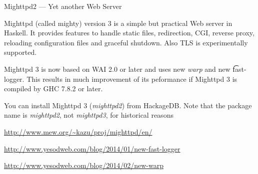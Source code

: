 \begin{hcarentry}[updated]{Mighttpd2 --- Yet another Web Server}
\label{mighttpd2}
\makeheader

Mighttpd (called mighty) version 3 is a simple but practical Web server in Haskell.
It provides features to handle static files, redirection, CGI, reverse proxy, reloading configuration files and graceful shutdown. Also TLS is experimentally supported.

Mighttpd 3 is now based on WAI 2.0 or later and uses new {\it warp} and new {\t fast-logger}. This results in much improvement of its peformance if Mighttpd 3 is compiled by GHC 7.8.2 or later.

You can install Mighttpd 3 ({\it mighttpd2}) from HackageDB. Note that the package name is {\it mighttpd2}, not {\it mighttpd3}, for historical reasons

\FurtherReading
\begin{compactitem}
\item \url{http://www.mew.org/~kazu/proj/mighttpd/en/}
\item \url{http://www.yesodweb.com/blog/2014/01/new-fast-logger}
\item \url{http://www.yesodweb.com/blog/2014/02/new-warp}
\end{compactitem}
\end{hcarentry}
